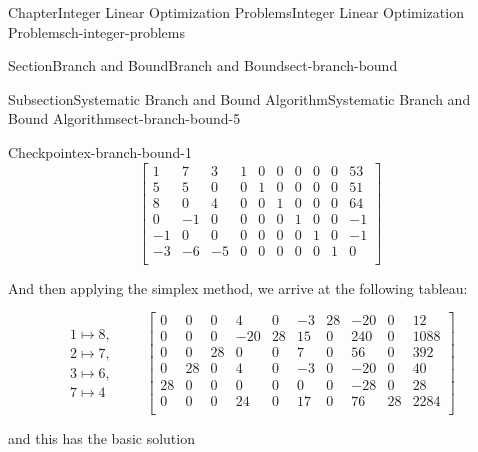 \documentclass[oneside,10pt,]{book}
\numberwithin{equation}{section}
\newcommand{\amp}{&}
\begin{document}
\begin{chapterptx}{Chapter}{Integer Linear Optimization Problems}{}{Integer Linear Optimization Problems}{}{}{ch-integer-problems}
\begin{sectionptx}{Section}{Branch and Bound}{}{Branch and Bound}{}{}{sect-branch-bound}
\begin{subsectionptx}{Subsection}{Systematic Branch and Bound Algorithm}{}{Systematic Branch and Bound Algorithm}{}{}{sect-branch-bound-5}
\begin{inlineexercise}{Checkpoint}{}{ex-branch-bound-1}
\begin{equation*}
\left[\begin{array}{rrr|rrrrrr|r} 1 \amp 7 \amp 3 \amp 1 \amp 0 \amp 0 \amp 0 \amp 0 \amp 0 \amp 53\\ 5 \amp 5 \amp 0 \amp 0 \amp 1 \amp 0 \amp 0 \amp 0 \amp 0 \amp 51\\ 8 \amp 0 \amp 4 \amp 0 \amp 0 \amp 1 \amp 0 \amp 0 \amp 0 \amp 64\\ 0 \amp -1 \amp 0 \amp 0 \amp 0 \amp 0 \amp 1 \amp 0 \amp 0 \amp -1\\ -1 \amp 0 \amp 0 \amp 0 \amp 0 \amp 0 \amp 0 \amp 1 \amp 0 \amp -1\\ \hline -3 \amp -6 \amp -5 \amp 0 \amp 0 \amp 0 \amp 0 \amp 0 \amp 1 \amp 0\\ \end{array} \right]
\end{equation*}
%
\par
And then applying the simplex method, we arrive at the following tableau:%
\par
%
\begin{equation*}
\begin{array}{r} 1 \mapsto 8, \\ 2 \mapsto 7, \\  3 \mapsto 6, \\ 7 \mapsto 4 \end{array} \qquad \left[\begin{array}{rrr|rrrrrr|r} 0 \amp 0 \amp 0 \amp 4 \amp 0 \amp -3 \amp 28 \amp -20 \amp 0 \amp 12\\ 0 \amp 0 \amp 0 \amp -20 \amp 28 \amp 15 \amp 0 \amp 240 \amp 0 \amp 1088\\ 0 \amp 0 \amp 28 \amp 0 \amp 0 \amp 7 \amp 0 \amp 56 \amp 0 \amp 392\\ 0 \amp 28 \amp 0 \amp 4 \amp 0 \amp -3 \amp 0 \amp -20 \amp 0 \amp 40\\ 28 \amp 0 \amp 0 \amp 0 \amp 0 \amp 0 \amp 0 \amp -28 \amp 0 \amp 28\\ \hline 0 \amp 0 \amp 0 \amp 24 \amp 0 \amp 17 \amp 0 \amp 76 \amp 28 \amp 2284\\ \end{array} \right]
\end{equation*}
%
\par
and this has the basic solution%
\par
%
\begin{equation*}

\end{equation*}
\end{inlineexercise}
\end{subsectionptx}
\end{sectionptx}
\end{chapterptx}
\end{document}
